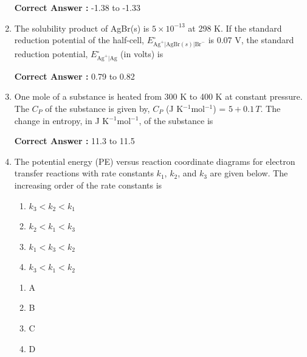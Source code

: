\documentclass[journal,12pt,onecolumn]{exam}
\theoremstyle{remark}
\newcommand{\correct}{\textcolor{correctgreen}{\checkmark}}
\newcommand{\wrong}{\textcolor{wrongred}{\ding{55}}} %
\begin{document}
\begin{enumerate}
\hfill{}

\textbf{Correct Answer :} \textcolor{green!60!black}{-1.38 to -1.33}


\item
The solubility product of AgBr(s) is $5 \times 10^{-13}$ at 298 K. If the standard reduction potential of the half-cell, $E^\circ_{\text{Ag}^+|\text{AgBr}(s)|\text{Br}^-}$ is 0.07 V, the standard reduction potential, $E^\circ_{\text{Ag}^+|\text{Ag}}$ (in volts) is \underline{\hspace{3cm}}

\hfill{}

\textbf{Correct Answer :} \textcolor{green!60!black}{0.79 to 0.82}


\item
One mole of a substance is heated from 300 K to 400 K at constant pressure. The $C_P$ of the substance is given by, $C_P$ (J K$^{-1}$mol$^{-1}$) = $5 + 0.1\,T$. The change in entropy, in J K$^{-1}$mol$^{-1}$, of the substance is \underline{\hspace{3cm}}

\hfill{}

\textbf{Correct Answer :} \textcolor{green!60!black}{11.3 to 11.5}




\item
The potential energy (PE) versus reaction coordinate diagrams for electron transfer reactions with rate constants $k_1$, $k_2$, and $k_3$ are given below. The increasing order of the rate constants is



\begin{enumerate}
    \item $k_3 < k_2 < k_1$
    \item $k_2 < k_1 < k_3$
    \item $k_1 < k_3 < k_2$
    \item $k_3 < k_1 < k_2$
\end{enumerate}

\hfill{}

\begin{multicols}{2}
\begin{enumerate}
    \item \wrong A
    \item \wrong B
    \item \wrong C
    \item \correct D
\end{enumerate}
\end{multicols}



\end{enumerate}
\end{document}
